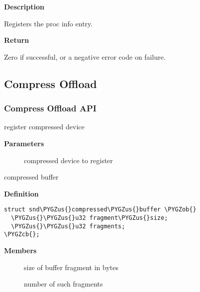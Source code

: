 \documentclass[a4paper,8pt,english]{sphinxmanual}
\def\PYGZus{\char`\_}
\def\PYGZob{\char`\{}
\def\PYGZcb{\char`\}}
\begin{document}
\textbf{Description}

Registers the proc info entry.

\textbf{Return}

Zero if successful, or a negative error code on failure.


\subsection{Compress Offload}
\label{sound/kernel-api/alsa-driver-api:compress-offload}

\subsubsection{Compress Offload API}
\label{sound/kernel-api/alsa-driver-api:compress-offload-api}

\begin{fulllineitems}
\label{sound/kernel-api/alsa-driver-api:c.snd_compress_register}
register compressed device

\end{fulllineitems}


\textbf{Parameters}
\begin{description}
\item[{}] \leavevmode
compressed device to register

\end{description}

\begin{fulllineitems}
\label{sound/kernel-api/alsa-driver-api:c.snd_compressed_buffer}
compressed buffer

\end{fulllineitems}


\textbf{Definition}

\begin{Verbatim}[commandchars=\\\{\}]
struct snd\PYGZus{}compressed\PYGZus{}buffer \PYGZob{}
  \PYGZus{}\PYGZus{}u32 fragment\PYGZus{}size;
  \PYGZus{}\PYGZus{}u32 fragments;
\PYGZcb{};
\end{Verbatim}

\textbf{Members}
\begin{description}
\item[{}] \leavevmode
size of buffer fragment in bytes

\item[{}] \leavevmode
number of such fragments

\end{description}
\end{document}
